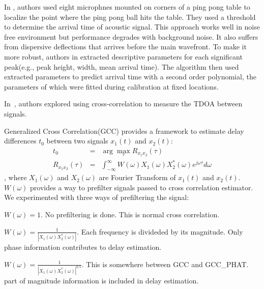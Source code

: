 In \cite{tdoa:ppp}, authors used eight microphnes mounted on corners of a ping pong table to localize the point where the ping pong ball hits the table. They used a threshold to determine the arrival time of acoustic signal. This approach works well in noise free environment but performance degrades with background noise. It also suffers from dispersive deflections that arrives before the main wavefront. To make it more robust, authors in \cite{tdoa:mit3} extracted descriptive parameters for each significant peak(e.g., peak height, width, mean arrival time). The algorithm then used extracted parameters to predict arrival time with a second order polynomial, the parameters of which were fitted during calibration at fixed locations.

In~\cite{tdoa:mit2, tdoa:3}, authors explored using cross-correlation to measure the TDOA between signals.

Generalized Cross Correlation(GCC) provides a framework to estimate delay differences $t_0$ between two signals $x_1(t)$ and $x_2(t)$:
\begin{eqnarray} \label{eq:gcc}
t_0 &=& \arg\max_{\tau} R_{x_1x_2}(\tau) \\
R_{x_1x_2}(\tau) &=& \int_{-\infty}^\infty W(\omega) X_1(\omega) X_2^{*}(\omega) e^{j\omega\tau} d\omega
\end{eqnarray}
, where $X_1(\omega)$ and $X_2(\omega)$ are Fourier Transform of $x_1(t)$ and $x_2(t)$. $W(\omega)$ provides a way to prefilter signals passed to cross correlation estimator. We experimented with three ways of prefiltering the signal:
\begin{description}
\item[GCC] $W(\omega) = 1$. No prefiltering is done. This is normal cross correlation.
\item[GCC\_PHAT] $W(\omega) = \frac{1}{\left|X_1(\omega)X_2^{*}(\omega)\right|}$. Each frequency is divideded by its magnitude. Only phase information contributes to delay estimation.
\item[GCC\_PHAT\_SQRT] $W(\omega) = \frac{1}{\left|X_1(\omega)X_2^*(\omega)\right|^{0.5}}$. This is somewhere between GCC and GCC\_PHAT. part of magnitude information is included in delay estimation.
\end{description}

